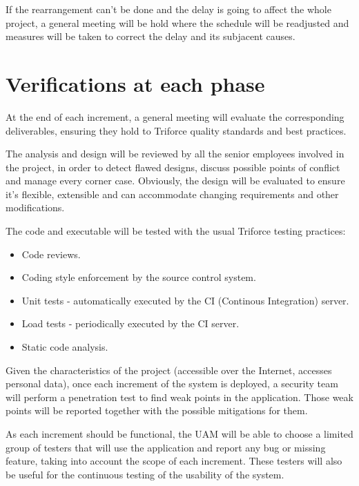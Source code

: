 If the rearrangement can't be done and the delay is going to affect the whole project, a general meeting will be hold where the schedule will be readjusted and measures will be taken to correct the delay and its subjacent causes.

\section{Verifications at each phase}

At the end of each increment, a general meeting will evaluate the corresponding deliverables, ensuring they hold to Triforce quality standards and best practices.

The analysis and design will be reviewed by all the senior employees involved in the project, in order to detect flawed designs, discuss possible points of conflict and manage every corner case. Obviously, the design will be evaluated to ensure it's flexible, extensible and can accommodate changing requirements and other modifications.

The code and executable will be tested with the usual Triforce testing practices:

\begin{itemize}[noitemsep]
\item Code reviews.
\item Coding style enforcement by the source control system.
\item Unit tests - automatically executed by the CI (Continous Integration) server.
\item Load tests - periodically executed by the CI server.
\item Static code analysis.
\end{itemize}

Given the characteristics of the project (accessible over the Internet, accesses personal data), once each increment of the system is deployed, a security team will perform a penetration test to find weak points in the application. Those weak points will be reported together with the possible mitigations for them.

As each increment should be functional, the UAM will be able to choose a limited group of testers that will use the application and report any bug or missing feature, taking into account the scope of each increment. These testers will also be useful for the continuous testing of the usability of the system.


